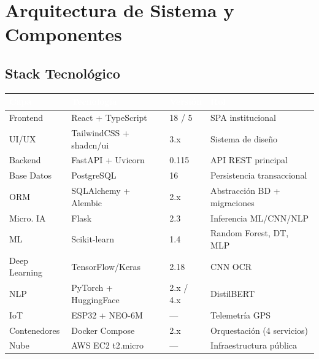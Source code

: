 \documentclass[12pt,a4paper,twoside]{report}
\begin{document}
\chapter{Arquitectura de Sistema y Componentes}

\section{Stack Tecnológico}
\begin{center}
\begin{tabularx}{\textwidth}{|l|l|l|X|}
\hline
\rowcolor{tableHdr}
\textcolor{white}{\textbf{Capa}} &
\textcolor{white}{\textbf{Tecnología}} &
\textcolor{white}{\textbf{Versión}} &
\textcolor{white}{\textbf{Rol}} \\
\hline
\rowcolor{rowOdd}Frontend    & React + TypeScript   & 18 / 5   & SPA institucional \\
\hline\rowcolor{rowEven}UI/UX      & TailwindCSS + shadcn/ui & 3.x  & Sistema de diseño \\
\hline\rowcolor{rowOdd}Backend     & FastAPI + Uvicorn    & 0.115    & API REST principal \\
\hline\rowcolor{rowEven}Base Datos  & PostgreSQL           & 16       & Persistencia transaccional \\
\hline\rowcolor{rowOdd}ORM         & SQLAlchemy + Alembic & 2.x      & Abstracción BD + migraciones \\
\hline\rowcolor{rowEven}Micro. IA   & Flask                & 2.3      & Inferencia ML/CNN/NLP \\
\hline\rowcolor{rowOdd}ML          & Scikit-learn         & 1.4      & Random Forest, DT, MLP \\
\hline\rowcolor{rowEven}Deep Learning & TensorFlow/Keras  & 2.18     & CNN OCR \\
\hline\rowcolor{rowOdd}NLP         & PyTorch + HuggingFace & 2.x / 4.x & DistilBERT \\
\hline\rowcolor{rowEven}IoT         & ESP32 + NEO-6M       & —        & Telemetría GPS \\
\hline\rowcolor{rowOdd}Contenedores & Docker Compose      & 2.x      & Orquestación (4 servicios) \\
\hline\rowcolor{rowEven}Nube        & AWS EC2 t2.micro     & —        & Infraestructura pública \\
\hline
\end{tabularx}
\end{center}
\end{document}

